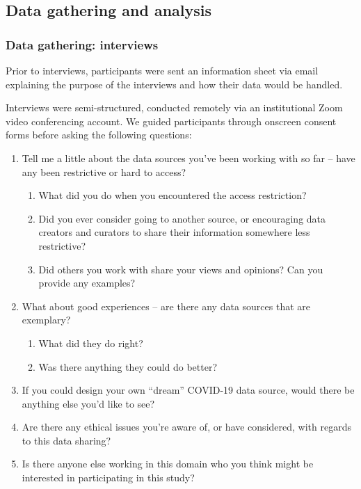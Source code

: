 \documentclass{CUP-JNL-DAP}%
\begin{document}
\subsection{Data gathering and analysis}

\subsubsection{Data gathering: interviews}
Prior to interviews, participants were sent an information sheet via email explaining the purpose of the interviews and how their data would be handled. 

Interviews were semi-structured, conducted remotely via an institutional Zoom video conferencing account. We guided participants through onscreen consent forms  before asking the following questions: 

\begin{enumerate}
\item Tell me a little about the data sources you've been working with so far – have any been restrictive or hard to access?
\begin{enumerate}
\item What did you do when you encountered the access restriction?
\item Did you ever consider going to another source, or encouraging data creators and curators to share their information somewhere less restrictive?
\item Did others you work with share your views and opinions? Can you provide any examples?
\end{enumerate}
\item What about good experiences – are there any data sources that are exemplary? 
\begin{enumerate}
\item What did they do right?
\item Was there anything they could do better?
\end{enumerate}
\item If you could design your own “dream” COVID-19 data source, would there be anything
else you’d like to see?
\item Are there any ethical issues you’re aware of, or have considered, with regards to this
data sharing?
\item Is there anyone else working in this domain who you think might be interested in
participating in this study?
\end{enumerate}
\end{document}
